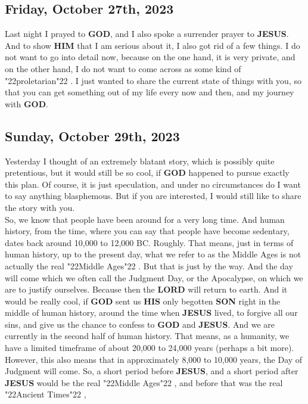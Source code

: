 \documentclass[10pt,a5paper]{article}
\newcommand{\God}[0]{\textbf{GOD}}
\newcommand{\Him}[0]{\textbf{HIM}}
\newcommand{\His}[0]{\textbf{HIS}}
\newcommand{\Jesus}[0]{\textbf{JESUS}}
\newcommand{\Lord}[0]{\textbf{LORD}}
\newcommand{\Son}[0]{\textbf{SON}}
\newcommand{\q}[1]{\char"22{#1}\char"22 }
\begin{document}
	\subsection{Friday, October 27th, 2023}
		Last night I prayed to {\God},
		and I also spoke a surrender prayer to {\Jesus}.
		And to show {\Him} that I am serious about it,
		I also got rid of a few things.
		I do not want to go into detail now,
		because on the one hand,
		it is very private,
		and on the other hand,
		I do not want to come across as some kind of \q{proletarian}.
		I just wanted to share the current state of things with you,
		so that you can get something out of my life every now and then,
		and my journey with {\God}.
		
	\subsection{Sunday, October 29th, 2023}
		Yesterday I thought of an extremely blatant story,
		which is possibly quite pretentious,
		but it would still be so cool,
		if {\God} happened to pursue exactly this plan.
		Of course,
		it is just speculation,
		and under no circumstances do I want to say anything blasphemous.
		But if you are interested,
		I would still like to share the story with you.
		\\
		So,
		we know that people have been around for a very long time.
		And human history,
		from the time,
		where you can say
		that people have become sedentary,
		dates back around 10,000 to 12,000 BC.
		Roughly.
		That means,
		just in terms of human history,
		up to the present day,
		what we refer to as the Middle Ages is not actually the real \q{Middle Ages}.
		But that is just by the way.
		And the day will come
		which we often call the Judgment Day,
		or the Apocalypse,
		on which we are to justify ourselves.
		Because then the {\Lord} will return to earth.
		And it would be really cool,
		if {\God} sent us {\His} only begotten {\Son} right in the middle of human history,
		around the time when {\Jesus} lived,
		to forgive all our sins,
		and give us the chance to confess to {\God} and {\Jesus}.
		And we are currently in the second half of human history.
		That means,
		as a humanity,
		we have a limited timeframe of about 20,000 to 24,000 years
		(perhaps a bit more).
		However,
		this also means that in approximately 8,000 to 10,000 years,
		the Day of Judgment will come.
		So,
		a short period before {\Jesus},
		and a short period after {\Jesus} would be the real \q{Middle Ages},
		and before that was the real \q{Ancient Times},
\end{document}
